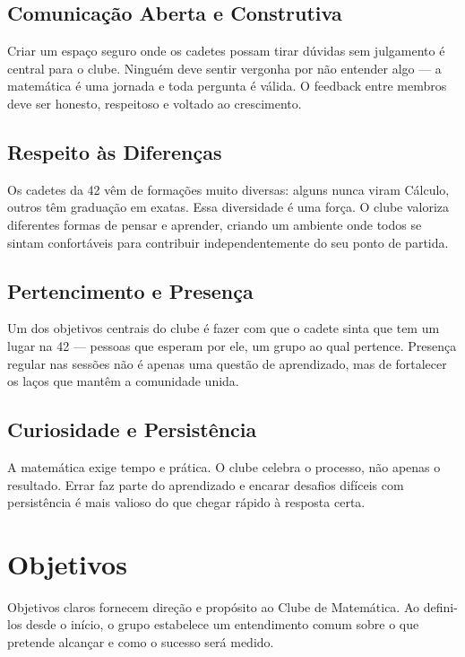 \documentclass[12pt, a4paper]{article}
\begin{document}
\subsection{Comunicação Aberta e Construtiva}

Criar um espaço seguro onde os cadetes possam tirar dúvidas sem julgamento é central para
o clube. Ninguém deve sentir vergonha por não entender algo --- a matemática é uma jornada
e toda pergunta é válida. O feedback entre membros deve ser honesto, respeitoso e voltado
ao crescimento.

\subsection{Respeito às Diferenças}

Os cadetes da 42 vêm de formações muito diversas: alguns nunca viram Cálculo, outros têm
graduação em exatas. Essa diversidade é uma força. O clube valoriza diferentes formas de
pensar e aprender, criando um ambiente onde todos se sintam confortáveis para contribuir
independentemente do seu ponto de partida.

\subsection{Pertencimento e Presença}

Um dos objetivos centrais do clube é fazer com que o cadete sinta que tem um lugar na
42 --- pessoas que esperam por ele, um grupo ao qual pertence. Presença regular nas sessões
não é apenas uma questão de aprendizado, mas de fortalecer os laços que mantêm a
comunidade unida.

\subsection{Curiosidade e Persistência}

A matemática exige tempo e prática. O clube celebra o processo, não apenas o resultado.
Errar faz parte do aprendizado e encarar desafios difíceis com persistência é mais valioso
do que chegar rápido à resposta certa.

\clearpage

\section{Objetivos}

Objetivos claros fornecem direção e propósito ao Clube de Matemática. Ao defini-los desde
o início, o grupo estabelece um entendimento comum sobre o que pretende alcançar e como o
sucesso será medido.
\end{document}
